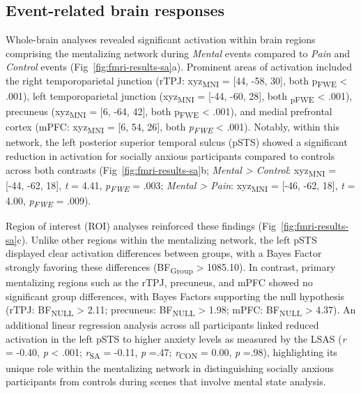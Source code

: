 \subsection{Event-related brain responses}
Whole-brain analyses revealed significant activation within brain regions comprising the mentalizing network during \textit{Mental} events compared to \textit{Pain} and \textit{Control} events (Fig~\ref{fig:fmri-results-sa}a). Prominent areas of activation included the right temporoparietal junction (rTPJ: xyz\textsubscript{MNI} = [44, -58, 30], both p\textsubscript{FWE} < .001), left temporoparietal junction (xyz\textsubscript{MNI} = [-44, -60, 28], both \textsubscript{pFWE} < .001), precuneus (xyz\textsubscript{MNI} = [6, -64, 42], both p\textsubscript{FWE} < .001), and medial prefrontal cortex (mPFC: xyz\textsubscript{MNI} = [6, 54, 26], both \textit{p\textsubscript{FWE}} < .001). Notably, within this network, the left posterior superior temporal sulcus (pSTS) showed a significant reduction in activation for socially anxious participants compared to controls across both contrasts (Fig~\ref{fig:fmri-results-sa}b; \textit{Mental > Control}: xyz\textsubscript{MNI} = [-44, -62, 18], \textit{t} = 4.41, \textit{p\textsubscript{FWE}} = .003; \textit{Mental > Pain}: xyz\textsubscript{MNI} = [-46, -62, 18], \textit{t} = 4.00, \textit{p\textsubscript{FWE}} = .009). 



Region of interest (ROI) analyses reinforced these findings (Fig~\ref{fig:fmri-results-sa}c). Unlike other regions within the mentalizing network, the left pSTS displayed clear activation differences between groups, with a Bayes Factor strongly favoring these differences (BF\textsubscript{Group} > 1085.10). In contrast, primary mentalizing regions such as the rTPJ, precuneus, and mPFC showed no significant group differences, with Bayes Factors supporting the null hypothesis (rTPJ: BF\textsubscript{NULL} > 2.11; precuneus: BF\textsubscript{NULL} > 1.98; mPFC: BF\textsubscript{NULL} > 4.37). An additional linear regression analysis across all participants linked reduced activation in the left pSTS to higher anxiety levels as measured by the LSAS (\textit{r} = -0.40, \textit{p} < .001; \textit{r}\textsubscript{SA} = -0.11, \textit{p} =.47; \textit{r}\textsubscript{CON} = 0.00, \textit{p} =.98), highlighting its unique role within the mentalizing network in distinguishing socially anxious participants from controls during scenes that involve mental state analysis.

